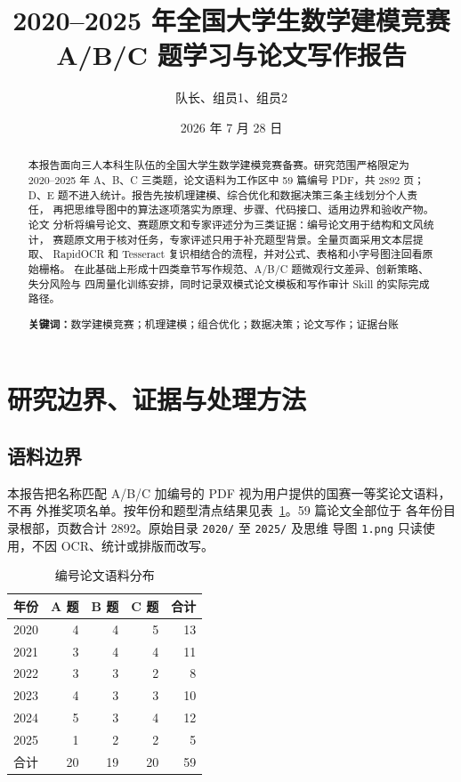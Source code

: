 \documentclass[UTF8,a4paper,12pt]{ctexart}
\title{\bfseries 2020--2025 年全国大学生数学建模竞赛\\A/B/C 题学习与论文写作报告}
\author{队长、组员1、组员2}
\date{2026 年 7 月 28 日}
\begin{document}
\maketitle

\begin{abstract}
本报告面向三人本科生队伍的全国大学生数学建模竞赛备赛。研究范围严格限定为
2020--2025 年 A、B、C 三类题，论文语料为工作区中 59 篇编号 PDF，共 2892 页；
D、E 题不进入统计。报告先按机理建模、综合优化和数据决策三条主线划分个人责任，
再把思维导图中的算法逐项落实为原理、步骤、代码接口、适用边界和验收产物。论文
分析将编号论文、赛题原文和专家评述分为三类证据：编号论文用于结构和文风统计，
赛题原文用于核对任务，专家评述只用于补充题型背景。全量页面采用文本层提取、
RapidOCR 和 Tesseract 复识相结合的流程，并对公式、表格和小字号图注回看原始栅格。
在此基础上形成十四类章节写作规范、A/B/C 题微观行文差异、创新策略、失分风险与
四周量化训练安排，同时记录双模式论文模板和写作审计 Skill 的实际完成路径。

\textbf{关键词：}数学建模竞赛；机理建模；组合优化；数据决策；论文写作；证据台账
\end{abstract}

\tableofcontents
\newpage

\section{研究边界、证据与处理方法}

\subsection{语料边界}

本报告把名称匹配 A/B/C 加编号的 PDF 视为用户提供的国赛一等奖论文语料，不再
外推奖项名单。按年份和题型清点结果见表~\ref{tab:corpus-count}。59 篇论文全部位于
各年份目录根部，页数合计 2892。原始目录 \texttt{2020/} 至 \texttt{2025/} 及思维
导图 \texttt{1.png} 只读使用，不因 OCR、统计或排版而改写。

\begin{table}[htbp]
\centering
\caption{编号论文语料分布}
\label{tab:corpus-count}
\begin{tabular}{crrrr}
\toprule
年份 & A 题 & B 题 & C 题 & 合计\\
\midrule
2020 & 4 & 4 & 5 & 13\\
2021 & 3 & 4 & 4 & 11\\
2022 & 3 & 3 & 2 & 8\\
2023 & 4 & 3 & 3 & 10\\
2024 & 5 & 3 & 4 & 12\\
2025 & 1 & 2 & 2 & 5\\
\midrule
合计 & 20 & 19 & 20 & 59\\
\bottomrule
\end{tabular}
\end{table}
\end{document}
